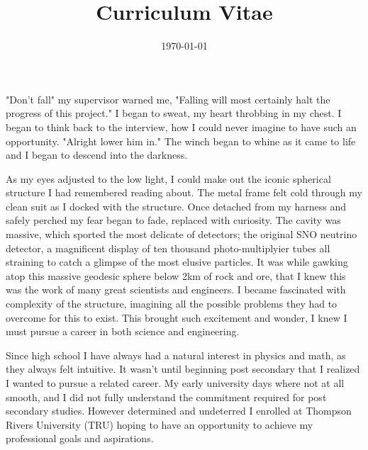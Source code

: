 \documentclass[11pt,a4paper]{moderncv} %
\title{Curriculum Vitae}
\begin{document}


\clearpage

\date{\today} %
\opening{} %
\closing{} %

\makelettertitle %

"Don't fall" my supervisor warned me, "Falling will most certainly halt the progress of this project." I began to sweat, my heart throbbing in my chest. I began to think back to the interview, how I could never imagine to have such an opportunity. "Alright lower him in." The winch began to whine as it came to life and I began to descend into the darkness.

 As my eyes adjusted to the low light, I could make out the iconic spherical structure I had remembered reading about. The metal frame felt cold through my clean suit as I docked with the structure. Once detached from my harness and safely perched my fear began to fade, replaced with curiosity. The cavity was massive, which sported the most delicate of detectors; the original SNO neutrino detector, a magnificent display of ten thousand photo-multiplyier tubes all straining to catch a glimpse of the most elusive particles. It was while gawking atop this massive geodesic sphere below 2km of rock and ore, that I knew this was the work of many great scientists and engineers. I became fascinated with complexity of the structure, imagining all the possible problems they had to overcome for this to exist. This brought such excitement and wonder, I knew I must pursue a career in both science and engineering. 

 Since high school I have always had a natural interest in physics and math, as they always felt intuitive. It wasn't until beginning post secondary that I realized I wanted to pursue a related career. My early university days where not at all smooth, and I did not fully understand the commitment required for post secondary studies. However determined and undeterred I enrolled at Thompson Rivers University (TRU) hoping to have an opportunity to achieve my professional goals and aspirations.
\end{document}
